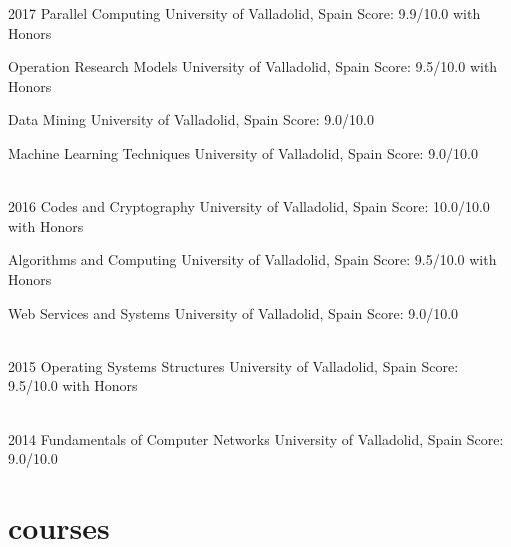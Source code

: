 \documentclass[]{friggeri-cv} %
\begin{document}
        \begin{entrylist}

            \entry
            {2017}
            {Parallel Computing}
            {University of Valladolid, Spain}
            {Score: 9.9/10.0 with Honors}

            \entry
            {}
            {Operation Research Models}
            {University of Valladolid, Spain}
            {Score: 9.5/10.0 with Honors}

            \entry
            {}
            {Data Mining}
            {University of Valladolid, Spain}
            {Score: 9.0/10.0}

            \entry
            {}
            {Machine Learning Techniques}
            {University of Valladolid, Spain}
            {Score: 9.0/10.0}

            \\
            \entry
            {2016}
            {Codes and Cryptography}
            {University of Valladolid, Spain}
            {Score: 10.0/10.0 with Honors}

            \entry
            {}
            {Algorithms and Computing}
            {University of Valladolid, Spain}
            {Score: 9.5/10.0 with Honors}

            \entry
            {}
            {Web Services and Systems}
            {University of Valladolid, Spain}
            {Score: 9.0/10.0}

            \\
            \entry
            {2015}
            {Operating Systems Structures}
            {University of Valladolid, Spain}
            {Score: 9.5/10.0 with Honors}

            \\
            \entry
            {2014}
            {Fundamentals of Computer Networks}
            {University of Valladolid, Spain}
            {Score: 9.0/10.0}

        \end{entrylist}



    \section{courses}
\end{document}
